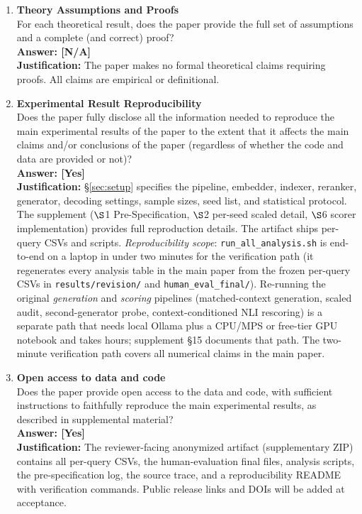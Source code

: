 \begin{enumerate}
\item {\bf Theory Assumptions and Proofs}\\
For each theoretical result, does the paper provide the full set of
assumptions and a complete (and correct) proof?
\\\textbf{Answer: [N/A]}
\\\textbf{Justification:} The paper makes no formal theoretical
claims requiring proofs. All claims are empirical or definitional.

\item {\bf Experimental Result Reproducibility}\\
Does the paper fully disclose all the information needed to reproduce
the main experimental results of the paper to the extent that it
affects the main claims and/or conclusions of the paper (regardless of
whether the code and data are provided or not)?
\\\textbf{Answer: [Yes]}
\\\textbf{Justification:} \S\ref{sec:setup} specifies the pipeline,
embedder, indexer, reranker, generator, decoding settings, sample
sizes, seed list, and statistical protocol. The supplement
($\S$1 Pre-Specification, $\S$2 per-seed scaled detail, $\S$6 scorer
implementation) provides full reproduction details. The artifact
ships per-query CSVs and scripts. \emph{Reproducibility scope}:
\texttt{run\_all\_analysis.sh} is end-to-end on a laptop in under
two minutes for the verification path (it regenerates every
analysis table in the main paper from the frozen per-query CSVs in
\texttt{results/revision/} and \texttt{human\_eval\_final/}).
Re-running the original \emph{generation} and \emph{scoring}
pipelines (matched-context generation, scaled audit, second-generator
probe, context-conditioned NLI rescoring) is a separate path that
needs local Ollama plus a CPU/MPS or free-tier GPU notebook and
takes hours; supplement \S 15 documents that path. The two-minute
verification path covers all numerical claims in the main paper.

\item {\bf Open access to data and code}\\
Does the paper provide open access to the data and code, with
sufficient instructions to faithfully reproduce the main experimental
results, as described in supplemental material?
\\\textbf{Answer: [Yes]}
\\\textbf{Justification:} The reviewer-facing anonymized artifact
(supplementary ZIP) contains all per-query CSVs, the human-evaluation
final files, analysis scripts, the pre-specification log, the source
trace, and a reproducibility README with verification commands.
Public release links and DOIs will be added at acceptance.


\end{enumerate}

